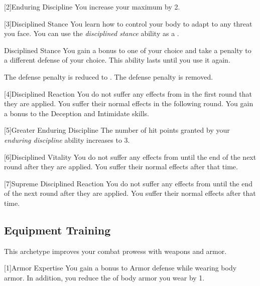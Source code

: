         [2]{Enduring Discipline}
        You increase your maximum  by 2.

        [3]{Disciplined Stance}
        You learn how to control your body to adapt to any threat you face.
        You can use the \textit{disciplined stance} ability as a .
        \begin{freeability}{Disciplined Stance}
            You gain a  bonus to one  of your choice and take a  penalty to a different defense of your choice.
            This ability lasts until you use it again.

            \rankline
             The defense penalty is reduced to .
             The defense penalty is removed.
        \end{freeability}

        [4]{Disciplined Reaction}
        You do not suffer any effects from  in the first round that they are applied.
        You suffer their normal effects in the following round.
        You gain a  bonus to the Deception and Intimidate skills.

        [5]{Greater Enduring Discipline}
        The number of hit points granted by your \textit{enduring discipline} ability increases to 3.

        [6]{Disciplined Vitality}
        You do not suffer any effects from  until the end of the next round after they are applied.
        You suffer their normal effects after that time.

        [7]{Supreme Disciplined Reaction}
        You do not suffer any effects from  until the end of the next round after they are applied.
        You suffer their normal effects after that time.

    \subsection{Equipment Training}
        This archetype improves your combat prowess with weapons and armor.

        [1]{Armor Expertise}
        You gain a  bonus to Armor defense while wearing body armor.
        In addition, you reduce the  of body armor you wear by 1.

